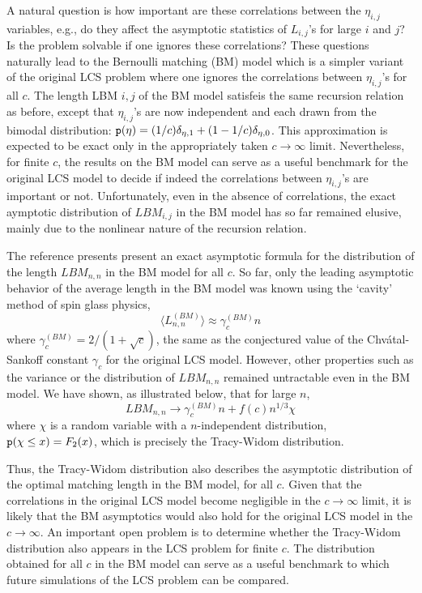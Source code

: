 A natural question is how important are these correlations between the $\eta_{i,j}$ variables, e.g., do they affect the asymptotic statistics of $L_{i,j}$’s for large $i$ and $j$? Is the problem solvable if one ignores these correlations? These questions naturally lead to the Bernoulli matching (BM) model which is a simpler variant of the original LCS problem where one ignores the correlations between $\eta_{i,j}$’s for all $c$. The length LBM $i,j$ of the BM model satisfeis the same recursion relation as before, except that $\eta_{i,j}$’s are now independent and each drawn from the bimodal distribution: $\mathtt{p}(\eta) = (1/c) \delta_{\eta,1} + (1-1/c) \delta_{\eta,0}$. This approximation is expected to be exact only in the appropriately taken $c \rightarrow \infty$ limit. Nevertheless, for finite $c$, the results on the BM model can serve as a useful benchmark for the original LCS model to decide if indeed the correlations between $\eta_{i,j}$’s are important or not. Unfortunately, even in the absence of correlations, the exact aymptotic distribution of $LBM_{i,j}$ in the BM model has so far remained elusive, mainly due to the nonlinear nature of the recursion relation. 

The reference presents present an exact asymptotic formula for the distribution of the length $LBM_{n,n}$ in the BM model for all $c$. So far, only the leading asymptotic behavior of the average length in the BM model was known using the ‘cavity’ method of spin glass physics,
\begin{equation}
	 \langle L^{(BM)}_{n,n} \rangle \approx \gamma^{(BM)}_c n
\end{equation}
where $\gamma_c^{(BM)} = 2/(1+\sqrt{c})$, the same as the conjectured value of the Chvátal-Sankoff constant $\gamma_c$ for the original LCS model. However, other properties such as the variance or the distribution of $LBM_{n,n}$ remained untractable even in the BM model. We have shown, as illustrated below, that for large $n$,
\begin{equation}
LBM_{n,n} \rightarrow \gamma^{(BM)}_c n + f(c) n^{1/3} \chi	
\end{equation}
where $\chi$ is a random variable with a $n$-independent distribution, $\mathtt{p}(\chi \leq x) = F_2(x)$, which is precisely the Tracy-Widom distribution.

Thus, the Tracy-Widom distribution also describes the asymptotic distribution of the optimal matching length in the BM model, for all $c$. Given that the correlations in the original LCS model become negligible in the $c \rightarrow \infty$ limit, it is likely that the BM asymptotics would also hold for the original LCS model in the $c \rightarrow \infty$. An important open problem is to determine whether the Tracy-Widom distribution also appears in the LCS problem for finite $c$. The distribution obtained for all $c$ in the BM model can serve as a useful benchmark to which future simulations of the LCS problem can be compared. 

